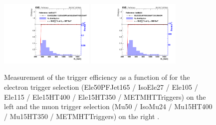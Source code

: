 \begin{figure}[!hbt]
  \begin{center}
    \includegraphics[width=0.4\textwidth]{Plots/trigger/HT_IsoEle27T_EffFit_test_HLT_Ele105ORHLT_Ele115ORHLT_Ele50PFJet165ORHLT_EleHT400ORHLT_EleHT350ORHLT_MetOR.pdf}
    \includegraphics[width=0.4\textwidth]{Plots/trigger/HT_IsoMu24_EffFit_test_HLT_Mu50ORHLT_MuHT400ORHLT_MuHT350ORHLT_MetOR.pdf}
  \end{center}
  \caption{Measurement of the trigger efficiency as a function of \HT for the
    electron trigger selection (Ele50PFJet165 / IsoEle27 / Ele105 / Ele115 /
    Ele15HT400 / Ele15HT350 / METMHTTriggers) on the left and the muon trigger
    selection (Mu50 / IsoMu24 / Mu15HT400 / Mu15HT350 / METMHTTriggers) on the
    right \cite{trigger}.
  \label{fig:trig_eff_HT}}
  \end{figure}
